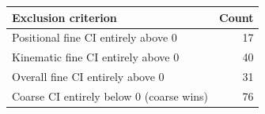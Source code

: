 \begin{tabular}{lr}
\toprule
Exclusion criterion & Count\\
\midrule
Positional fine CI entirely above 0 & 17\\
Kinematic fine CI entirely above 0 & 40\\
Overall fine CI entirely above 0 & 31\\
Coarse CI entirely below 0 (coarse wins) & 76\\
\bottomrule
\end{tabular}
